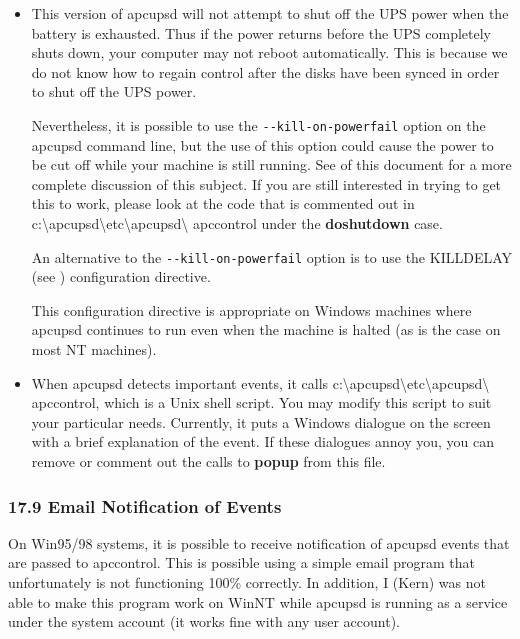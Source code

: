 {{{{{{{{{{\begin{itemize}
\item This version of apcupsd will not attempt to shut off the UPS power when
the battery is exhausted. Thus if the power returns before the UPS completely
shuts down, your computer may not reboot automatically. This is because we do
not know how to regain control after the disks have been synced in order to
shut off the UPS power.  

Nevertheless, it is possible to use the {\tt \verb{--{kill-on-powerfail} option on
the apcupsd command line, but the use of this option could cause the power to
be cut off while your machine is still running. See 
 of this
document for a more complete discussion of this subject. If you are still
interested in trying to get this to work, please look at the code that is
commented out in
c:\textbackslash{}apcupsd\textbackslash{}etc\textbackslash{}apcupsd\textbackslash
{}apccontrol under the {\bf doshutdown} case.  

An alternative to the {\tt \verb{--{kill-on-powerfail} option is to use the KILLDELAY
(see 
) configuration
directive.  

This configuration directive is appropriate on Windows machines where apcupsd
continues to run even when the machine is halted (as is the case on most NT
machines).  
\item When apcupsd detects important events, it calls
c:\textbackslash{}apcupsd\textbackslash{}etc\textbackslash{}apcupsd\textbackslash
{}apccontrol, which is a Unix shell script. You may modify this script to suit
your particular needs.  Currently, it puts a Windows dialogue on the screen
with a brief explanation of the event. If these dialogues annoy you, you can
remove or comment out the calls to {\bf popup} from this file. 
\end{itemize}

\label{Email-Notification-of-Events}

\subsubsection*{17.9 Email Notification of Events}

\label{index-Email-181}
\label{index-Notification_002c-Email-182}
On Win95/98 systems, it is possible to receive notification of apcupsd events
that are passed to apccontrol. This is possible using a simple email program
that unfortunately is not functioning 100\% correctly. In addition, I (Kern)
was not able to make this program work on WinNT while apcupsd is running as a
service under the system account (it works fine with any user account).  

}}}}}}}}}}
